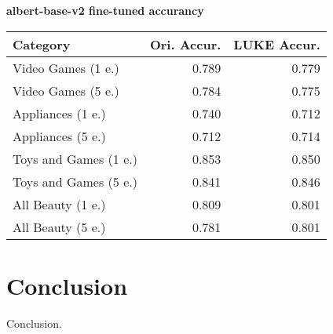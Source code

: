\documentclass[11pt,a4paper]{article}
\begin{document}
\begin{center}
\textbf{albert-base-v2 fine-tuned accurancy}
\noindent\begin{tabular}{|l|r|r|}
\hline
 Category & Ori. Accur. & LUKE Accur. \\
\hline
Video Games (1 e.)    & 0.789       & 0.779       \\
Video Games (5 e.)    & 0.784       & 0.775       \\
Appliances (1 e.)     & 0.740       & 0.712       \\
Appliances (5 e.)     & 0.712       & 0.714       \\
Toys and Games (1 e.) & 0.853       & 0.850       \\
Toys and Games (5 e.) & 0.841       & 0.846       \\
All Beauty (1 e.)     & 0.809       & 0.801       \\
All Beauty (5 e.)     & 0.781       & 0.801       \\
\hline
\end{tabular}
\end{center}



\section{Conclusion}

Conclusion.



\end{document}
